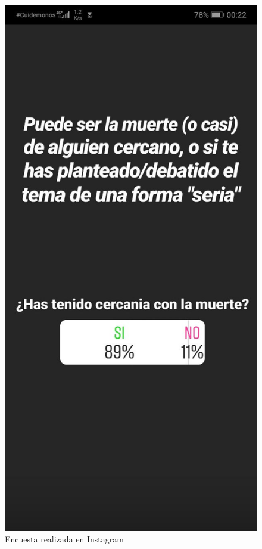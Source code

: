 \begin{figure}[h]
\begin{minipage}{.3\textwidth}
    \end{minipage}
    \begin{minipage}{.3\textwidth}
        \includegraphics[width=\textwidth]{imgs/insta3.jpg}
    \end{minipage}
    \caption{Encuesta realizada en Instagram}
    \label{fig:instagram}
\end{figure}

